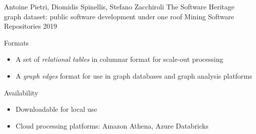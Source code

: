 \documentclass[aspectratio=169,xcolor=table]{beamer}
\begin{document}
\begin{frame}
\begin{block}{}
            \footnotesize
            \begin{thebibliography}{msr2019}
                 Antoine Pietri, Diomidis Spinellis, Stefano Zacchiroli\newblock
                The Software Heritage graph dataset: public software development under one roof\newblock
                Mining Software Repositories 2019\newblock
            \end{thebibliography}
        \end{block}

        \begin{block}{Formats}
            \begin{itemize}
                \item A set of \emph{relational tables} in columnar format for
                    scale-out processing
                \item A \emph{graph edges} format for use in graph databases
                    and graph analysis platforms
            \end{itemize}
        \end{block}

        \begin{block}{Availability}
            \begin{itemize}
                \item Downloadable for local use
                \item Cloud processing platforms: Amazon Athena, Azure
                    Databricks
            \end{itemize}
        \end{block}
    \end{frame}
\end{document}
